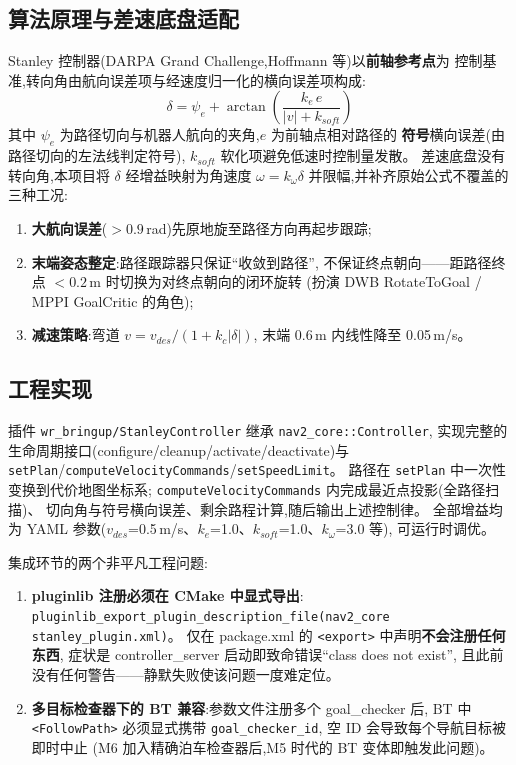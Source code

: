 \documentclass[12pt, a4paper]{ctexart}
\begin{document}
\subsection{算法原理与差速底盘适配}
Stanley 控制器(DARPA Grand Challenge,Hoffmann 等)以\textbf{前轴参考点}为
控制基准,转向角由航向误差项与经速度归一化的横向误差项构成:
\begin{equation}
  \delta = \psi_e + \arctan\!\left(\frac{k_e \, e}{|v| + k_{soft}}\right)
\end{equation}
其中 $\psi_e$ 为路径切向与机器人航向的夹角,$e$ 为前轴点相对路径的
\textbf{符号}横向误差(由路径切向的左法线判定符号),
$k_{soft}$ 软化项避免低速时控制量发散。
差速底盘没有转向角,本项目将 $\delta$ 经增益映射为角速度
$\omega = k_\omega \delta$ 并限幅,并补齐原始公式不覆盖的三种工况:
\begin{enumerate}
  \item \textbf{大航向误差}($>\!0.9$\,rad)先原地旋至路径方向再起步跟踪;
  \item \textbf{末端姿态整定}:路径跟踪器只保证``收敛到路径'',
        不保证终点朝向——距路径终点 $<0.2$\,m 时切换为对终点朝向的闭环旋转
        (扮演 DWB RotateToGoal / MPPI GoalCritic 的角色);
  \item \textbf{减速策略}:弯道 $v = v_{des}/(1 + k_c|\delta|)$,
        末端 0.6\,m 内线性降至 0.05\,m/s。
\end{enumerate}

\subsection{工程实现}
插件 \texttt{wr\_bringup/StanleyController} 继承 \texttt{nav2\_core::Controller},
实现完整的生命周期接口(configure/cleanup/activate/deactivate)与
\texttt{setPlan}/\texttt{computeVelocityCommands}/\texttt{setSpeedLimit}。
路径在 \texttt{setPlan} 中一次性变换到代价地图坐标系;
\texttt{computeVelocityCommands} 内完成最近点投影(全路径扫描)、
切向角与符号横向误差、剩余路程计算,随后输出上述控制律。
全部增益均为 YAML 参数($v_{des}$=0.5\,m/s、$k_e$=1.0、$k_{soft}$=1.0、$k_\omega$=3.0 等),
可运行时调优。

集成环节的两个非平凡工程问题:
\begin{enumerate}
  \item \textbf{pluginlib 注册必须在 CMake 中显式导出}:
        \texttt{pluginlib\_export\_plugin\_description\_file(nav2\_core stanley\_plugin.xml)}。
        仅在 package.xml 的 \texttt{<export>} 中声明\textbf{不会注册任何东西},
        症状是 controller\_server 启动即致命错误``class does not exist'',
        且此前没有任何警告——静默失败使该问题一度难定位。
  \item \textbf{多目标检查器下的 BT 兼容}:参数文件注册多个 goal\_checker 后,
        BT 中 \texttt{<FollowPath>} 必须显式携带 \texttt{goal\_checker\_id},
        空 ID 会导致每个导航目标被即时中止
        (M6 加入精确泊车检查器后,M5 时代的 BT 变体即触发此问题)。
\end{enumerate}
\end{document}
